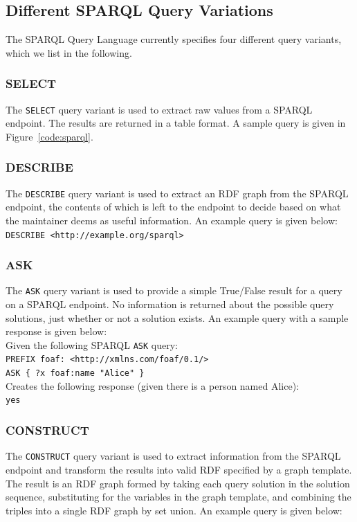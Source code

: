 \documentclass[12pt]{article}
\begin{document}
\subsection{Different SPARQL Query Variations}
The SPARQL Query Language currently specifies four different query variants, which we list in the following. 

\subsubsection{SELECT}
The \texttt{SELECT} query variant is used to extract raw values from a SPARQL endpoint. The results are returned in a table format. A sample query is given in Figure~\ref{code:sparql}.

\subsubsection{DESCRIBE}
The \texttt{DESCRIBE} query variant is used to extract an RDF graph from the SPARQL endpoint, the contents of which is left to the endpoint to decide based on what the maintainer deems as useful information. An example query is given below:\\

\texttt{DESCRIBE <http://example.org/sparql>}

\subsubsection{ASK}
The \texttt{ASK} query variant is used to provide a simple True/False result for a query on a SPARQL endpoint. No information is returned about the possible query solutions, just whether or not a solution exists. An example query with a sample response is given below:\\

\noindent Given the following SPARQL \texttt{ASK} query:\\

\texttt{PREFIX foaf: <http://xmlns.com/foaf/0.1/>\\
\indent ASK \{ ?x foaf:name  "Alice" \}}\\

\noindent Creates the following response (given there is a person named Alice):\\

\texttt{yes}

\subsubsection{CONSTRUCT}
The \texttt{CONSTRUCT} query variant is used to extract information from the SPARQL endpoint and transform the results into valid RDF specified by a graph template. The result is an RDF graph formed by taking each query solution in the solution sequence, substituting for the variables in the graph template, and combining the triples into a single RDF graph by set union. An example query is given below:\\
\end{document}
